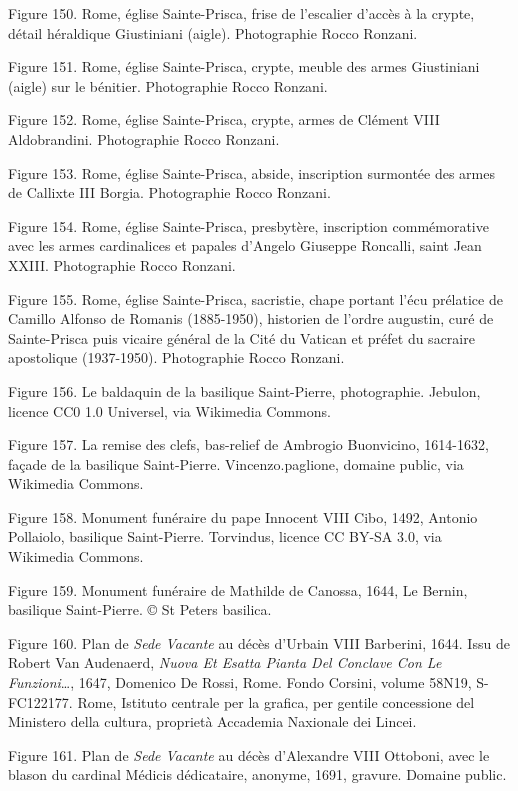 \documentclass[12pt,twoside,openany]{book}
\begin{document}
Figure 150. Rome, église Sainte-Prisca, frise de l’escalier d’accès à la crypte, détail héraldique Giustiniani (aigle). Photographie Rocco Ronzani.

Figure 151. Rome, église Sainte-Prisca, crypte, meuble des armes Giustiniani (aigle) sur le bénitier. Photographie Rocco Ronzani.

Figure 152. Rome, église Sainte-Prisca, crypte, armes de Clément VIII Aldobrandini. Photographie Rocco Ronzani.

Figure 153. Rome, église Sainte-Prisca, abside, inscription surmontée des armes de Callixte III Borgia. Photographie Rocco Ronzani.

Figure 154. Rome, église Sainte-Prisca, presbytère, inscription commémorative avec les armes cardinalices et papales d’Angelo Giuseppe Roncalli, saint Jean XXIII. Photographie Rocco Ronzani.

Figure 155. Rome, église Sainte-Prisca, sacristie, chape portant l’écu prélatice de Camillo Alfonso de Romanis (1885-1950), historien de l’ordre augustin, curé de Sainte-Prisca puis vicaire général de la Cité du Vatican et préfet du sacraire apostolique (1937-1950). Photographie Rocco Ronzani.

Figure 156. Le baldaquin de la basilique Saint-Pierre, photographie. Jebulon, licence CC0 1.0 Universel, via Wikimedia Commons.

Figure 157. La remise des clefs, bas-relief de Ambrogio Buonvicino, 1614-1632, façade de la basilique Saint-Pierre. Vincenzo.paglione, domaine public, via Wikimedia Commons.

Figure 158. Monument funéraire du pape Innocent VIII Cibo, 1492, Antonio Pollaiolo, basilique Saint-Pierre. Torvindus, licence CC BY-SA 3.0, via Wikimedia Commons.

Figure 159. Monument funéraire de Mathilde de Canossa, 1644, Le Bernin, basilique Saint-Pierre. © St Peters basilica.

Figure 160. Plan de \textit{Sede Vacante} au décès d’Urbain VIII Barberini, 1644. Issu de Robert Van Audenaerd, \textit{Nuova Et Esatta Pianta Del Conclave Con Le Funzioni}…, 1647, Domenico De Rossi, Rome. Fondo Corsini, volume 58N19, S-FC122177. Rome, Istituto centrale per la grafica, per gentile concessione del Ministero della cultura, proprietà Accademia Naxionale dei Lincei.

Figure 161. Plan de \textit{Sede Vacante} au décès d’Alexandre VIII Ottoboni, avec le blason du cardinal Médicis dédicataire, anonyme, 1691, gravure. Domaine public.
\end{document}
